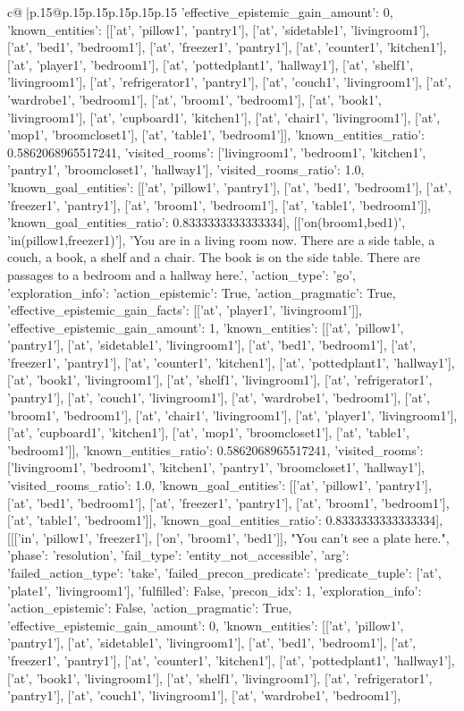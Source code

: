 \documentclass{article}
\begin{document}
{\begin{supertabular}{c@{$\;$}|p{.15\linewidth}@{}p{.15\linewidth}p{.15\linewidth}p{.15\linewidth}p{.15\linewidth}p{.15\linewidth}}
{{{'effective_epistemic_gain_amount': 0, 'known_entities': [['at', 'pillow1', 'pantry1'], ['at', 'sidetable1', 'livingroom1'], ['at', 'bed1', 'bedroom1'], ['at', 'freezer1', 'pantry1'], ['at', 'counter1', 'kitchen1'], ['at', 'player1', 'bedroom1'], ['at', 'pottedplant1', 'hallway1'], ['at', 'shelf1', 'livingroom1'], ['at', 'refrigerator1', 'pantry1'], ['at', 'couch1', 'livingroom1'], ['at', 'wardrobe1', 'bedroom1'], ['at', 'broom1', 'bedroom1'], ['at', 'book1', 'livingroom1'], ['at', 'cupboard1', 'kitchen1'], ['at', 'chair1', 'livingroom1'], ['at', 'mop1', 'broomcloset1'], ['at', 'table1', 'bedroom1']], 'known_entities_ratio': 0.5862068965517241, 'visited_rooms': ['livingroom1', 'bedroom1', 'kitchen1', 'pantry1', 'broomcloset1', 'hallway1'], 'visited_rooms_ratio': 1.0, 'known_goal_entities': [['at', 'pillow1', 'pantry1'], ['at', 'bed1', 'bedroom1'], ['at', 'freezer1', 'pantry1'], ['at', 'broom1', 'bedroom1'], ['at', 'table1', 'bedroom1']], 'known_goal_entities_ratio': 0.8333333333333334}}], [['on(broom1,bed1)', 'in(pillow1,freezer1)'], 'You are in a living room now. There are a side table, a couch, a book, a shelf and a chair. The book is on the side table. There are passages to a bedroom and a hallway here.', {'action_type': 'go', 'exploration_info': {'action_epistemic': True, 'action_pragmatic': True, 'effective_epistemic_gain_facts': [['at', 'player1', 'livingroom1']], 'effective_epistemic_gain_amount': 1, 'known_entities': [['at', 'pillow1', 'pantry1'], ['at', 'sidetable1', 'livingroom1'], ['at', 'bed1', 'bedroom1'], ['at', 'freezer1', 'pantry1'], ['at', 'counter1', 'kitchen1'], ['at', 'pottedplant1', 'hallway1'], ['at', 'book1', 'livingroom1'], ['at', 'shelf1', 'livingroom1'], ['at', 'refrigerator1', 'pantry1'], ['at', 'couch1', 'livingroom1'], ['at', 'wardrobe1', 'bedroom1'], ['at', 'broom1', 'bedroom1'], ['at', 'chair1', 'livingroom1'], ['at', 'player1', 'livingroom1'], ['at', 'cupboard1', 'kitchen1'], ['at', 'mop1', 'broomcloset1'], ['at', 'table1', 'bedroom1']], 'known_entities_ratio': 0.5862068965517241, 'visited_rooms': ['livingroom1', 'bedroom1', 'kitchen1', 'pantry1', 'broomcloset1', 'hallway1'], 'visited_rooms_ratio': 1.0, 'known_goal_entities': [['at', 'pillow1', 'pantry1'], ['at', 'bed1', 'bedroom1'], ['at', 'freezer1', 'pantry1'], ['at', 'broom1', 'bedroom1'], ['at', 'table1', 'bedroom1']], 'known_goal_entities_ratio': 0.8333333333333334}}], [[['in', 'pillow1', 'freezer1'], ['on', 'broom1', 'bed1']], "You can't see a plate here.", {'phase': 'resolution', 'fail_type': 'entity_not_accessible', 'arg': {'failed_action_type': 'take', 'failed_precon_predicate': {'predicate_tuple': ['at', 'plate1', 'livingroom1'], 'fulfilled': False, 'precon_idx': 1}}, 'exploration_info': {'action_epistemic': False, 'action_pragmatic': True, 'effective_epistemic_gain_amount': 0, 'known_entities': [['at', 'pillow1', 'pantry1'], ['at', 'sidetable1', 'livingroom1'], ['at', 'bed1', 'bedroom1'], ['at', 'freezer1', 'pantry1'], ['at', 'counter1', 'kitchen1'], ['at', 'pottedplant1', 'hallway1'], ['at', 'book1', 'livingroom1'], ['at', 'shelf1', 'livingroom1'], ['at', 'refrigerator1', 'pantry1'], ['at', 'couch1', 'livingroom1'], ['at', 'wardrobe1', 'bedroom1'], }}}
\end{supertabular}}
\end{document}
